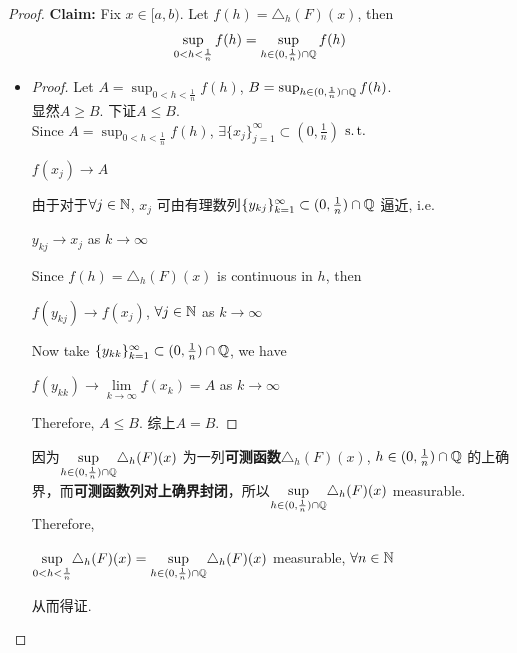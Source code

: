 \begin{lemma}
\begin{proof}
			\vspace{1em}
			
			\textbf{Claim:} Fix $x \in [a , b)$. Let $f(h) = \triangle_{h}(F)(x)$, then
			\begin{align}
				\sup_{0 < h < \frac{1}{n}}{f(h)} = \sup_{h \in (0 , \frac{1}{n}) \cap \mathbb{Q}}{f(h)}
			\end{align}
			
			\vspace{1em}
			\begin{itemize}
				\item 
				\begin{proof}
					Let $A = \sup_{0 < h < \frac{1}{n}}{f(h)}$, $B = \sup_{h \in (0 , \frac{1}{n}) \cap \mathbb{Q}}{f(h)}$. \\
					显然$A \geq B$. 下证$A \leq B$. \\
					Since $A = \sup_{0 < h < \frac{1}{n}}{f(h)}$, $\exists \{ x_j \}_{j = 1}^{\infty} \subset (0 , \frac{1}{n})$ $\operatorname{s.t.}$
					\begin{center}
						$f(x_j) \to A$
					\end{center}
					由于对于$\forall j \in \mathbb{N}$, $x_j$ 可由有理数列$\{ y_{kj} \}_{k = 1}^{\infty} \subset (0 , \frac{1}{n}) \cap \mathbb{Q}$ 逼近, i.e.
					\begin{center}
						$y_{kj} \to x_j$ as $k \to \infty$
					\end{center}
					Since $f(h) = \triangle_{h}(F)(x)$ is continuous in $h$, then
					\begin{center}
						$f(y_{kj}) \to f(x_j)$, $\forall j \in \mathbb{N}$ as $k \to \infty$ 
					\end{center}
					Now take $\{ y_{kk} \}_{k = 1}^{\infty} \subset (0 , \frac{1}{n}) \cap \mathbb{Q}$, we have
					\begin{center}
						$f(y_{kk}) \to \underset{k \to \infty}{\lim}{f(x_k)} = A$ as $k \to \infty$
					\end{center}
					Therefore, $A \leq B$. 综上$A = B$.
				\end{proof}
				
				\vspace{1em}
				因为$\underset{h \in (0 , \frac{1}{n}) \cap \mathbb{Q}}{\sup}{\triangle_{h}(F)(x)}$ 为一列\textbf{可测函数}$\triangle_{h}(F)(x)$, $h \in (0 , \frac{1}{n}) \cap \mathbb{Q}$ 的上确界，而\textbf{可测函数列对上确界封闭}，所以$\underset{h \in (0 , \frac{1}{n}) \cap \mathbb{Q}}{\sup}{\triangle_{h}(F)(x)}$ measurable. \\
				Therefore, 
				\begin{center}
					$\underset{0 < h < \frac{1}{n}}{\sup}{\triangle_{h}(F)(x)} = \underset{h \in (0 , \frac{1}{n}) \cap \mathbb{Q}}{\sup}{\triangle_{h}(F)(x)}$ measurable, $\forall n \in \mathbb{N}$
				\end{center}
				从而得证.
			\end{itemize}
			
		\end{proof}
	\end{lemma}


	\ifx\allfiles\undefined

\fi